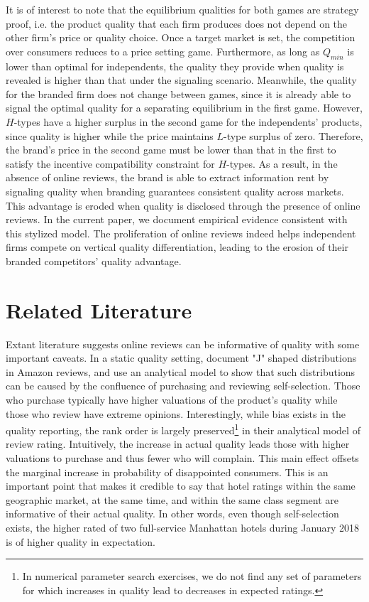 \documentclass{informs_mod} %
\begin{document}
It is of interest to note that the equilibrium qualities for both games are strategy proof, i.e. the product quality that each firm produces does not depend on the other firm's price or quality choice. Once a target market is set, the competition over consumers reduces to a price setting game. Furthermore, as long as $Q_{min}$ is lower than optimal for independents, the quality they provide when quality is revealed is higher than that under the signaling scenario. Meanwhile, the quality for the branded firm does not change between games, since it is already able to signal the optimal quality for a separating equilibrium in the first game. However, $H$-types have a higher surplus in the second game for the independents' products, since quality is higher while the price maintains $L$-type surplus of zero. Therefore, the brand's price in the second game must be lower than that in the first to satisfy the incentive compatibility constraint for $H$-types. As a result, in the absence of online reviews, the brand is able to extract information rent by signaling quality when branding guarantees consistent quality across markets. This advantage is eroded when quality is disclosed through the presence of online reviews. In the current paper, we document empirical evidence consistent with this stylized model. The proliferation of online reviews indeed helps independent firms compete on vertical quality differentiation, leading to the erosion of their branded competitors' quality advantage.

\section{Related Literature} \label{sec:litreview}

Extant literature suggests online reviews can be informative of quality with some important caveats. In a static quality setting, \citet{hu2006can} document "J" shaped distributions in Amazon reviews, and use an analytical model to show that such distributions can be caused by the confluence of purchasing and reviewing self-selection. Those who purchase typically have higher valuations of the product's quality while those who review have extreme opinions. Interestingly, while bias exists in the quality reporting, the rank order is largely preserved\footnote{In numerical parameter search exercises, we do not find any set of parameters for which increases in quality lead to decreases in expected ratings.} in their analytical model of review rating. Intuitively, the increase in actual quality leads those with higher valuations to purchase and thus fewer who will complain. This main effect offsets the marginal increase in probability of disappointed consumers. This is an important point that makes it credible to say that hotel ratings within the same geographic market, at the same time, and within the same class segment are informative of their actual quality. In other words, even though self-selection exists, the higher rated of two full-service Manhattan hotels during January 2018 is of higher quality in expectation.
\end{document}
